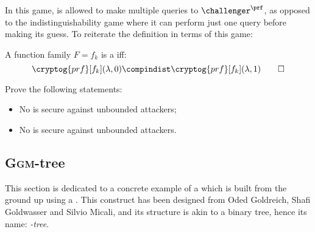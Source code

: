 In this game, \adversary{} is allowed to make multiple queries to $\challenger^\prf$, as opposed to the \prg{} indistinguishability game where it can perform just one query before making its guess. To reiterate the \prf{} definition in terms of this game:

\begin{definition}
    A function family $F = f_k$ is a \prf{} iff: 
    \[
        \cryptog{prf}[f_k](\lambda, 0) \compindist \cryptog{prf}[f_k](\lambda, 1) \qedhere
    \]
\end{definition}

\begin{exercise}
    Prove the following statements:
    \begin{itemize}
        \item No \prg{} is secure against unbounded attackers;
        \item No \prf{} is secure against unbounded attackers.
    \end{itemize}
   
\end{exercise}


\subsection{\textsc{Ggm}-tree}

This section is dedicated to a concrete example of a \prf{} which is built from the ground up using a \prg. This construct has been designed from Oded Goldreich, Shafi Goldwasser and Silvio Micali, and its structure is akin to a binary tree, hence its name: \emph{\ggm-tree}.

